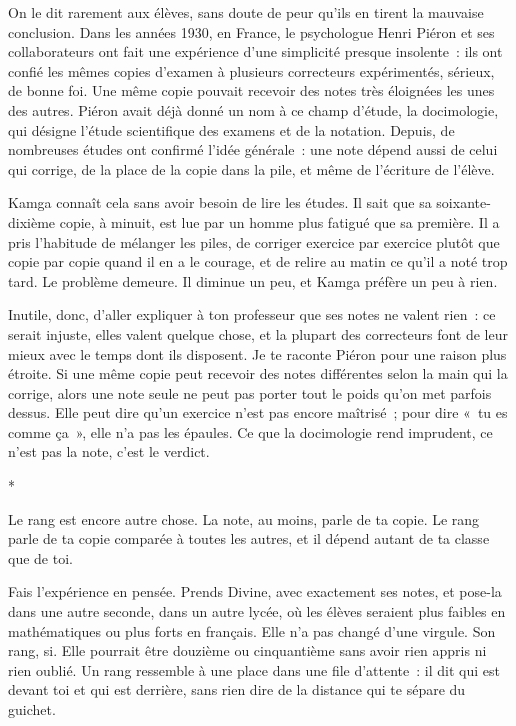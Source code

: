 \documentclass[10.5pt,twoside,openright]{book}
\newcommand{\asterisme}{\par\vspace{0.7em}\centerline{\color{gris}*\quad*\quad*}\vspace{0.7em}\par\noindent}
\begin{document}
On le dit rarement aux élèves, sans doute de peur qu’ils en tirent la mauvaise conclusion. Dans les années 1930, en France, le psychologue Henri Piéron et ses collaborateurs ont fait une expérience d’une simplicité presque insolente : ils ont confié les mêmes copies d’examen à plusieurs correcteurs expérimentés, sérieux, de bonne foi. Une même copie pouvait recevoir des notes très éloignées les unes des autres. Piéron avait déjà donné un nom à ce champ d’étude, la docimologie, qui désigne l’étude scientifique des examens et de la notation. Depuis, de nombreuses études ont confirmé l’idée générale : une note dépend aussi de celui qui corrige, de la place de la copie dans la pile, et même de l’écriture de l’élève.

Kamga connaît cela sans avoir besoin de lire les études. Il sait que sa soixante-dixième copie, à minuit, est lue par un homme plus fatigué que sa première. Il a pris l’habitude de mélanger les piles, de corriger exercice par exercice plutôt que copie par copie quand il en a le courage, et de relire au matin ce qu’il a noté trop tard. Le problème demeure. Il diminue un peu, et Kamga préfère un peu à rien.

Inutile, donc, d’aller expliquer à ton professeur que ses notes ne valent rien : ce serait injuste, elles valent quelque chose, et la plupart des correcteurs font de leur mieux avec le temps dont ils disposent. Je te raconte Piéron pour une raison plus étroite. Si une même copie peut recevoir des notes différentes selon la main qui la corrige, alors une note seule ne peut pas porter tout le poids qu’on met parfois dessus. Elle peut dire qu’un exercice n’est pas encore maîtrisé ; pour dire « tu es comme ça », elle n’a pas les épaules. Ce que la docimologie rend imprudent, ce n’est pas la note, c’est le verdict.

\asterisme

Le rang est encore autre chose. La note, au moins, parle de ta copie. Le rang parle de ta copie comparée à toutes les autres, et il dépend autant de ta classe que de toi.

Fais l’expérience en pensée. Prends Divine, avec exactement ses notes, et pose-la dans une autre seconde, dans un autre lycée, où les élèves seraient plus faibles en mathématiques ou plus forts en français. Elle n’a pas changé d’une virgule. Son rang, si. Elle pourrait être douzième ou cinquantième sans avoir rien appris ni rien oublié. Un rang ressemble à une place dans une file d’attente : il dit qui est devant toi et qui est derrière, sans rien dire de la distance qui te sépare du guichet.
\end{document}
